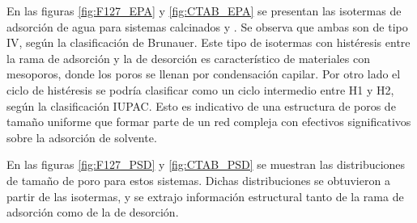 		 En las figuras \ref{fig:F127_EPA} y \ref{fig:CTAB_EPA} se presentan las isotermas de adsorción de agua para sistemas calcinados \pdmF\space y \pdmC. Se observa que ambas son de tipo IV, según la clasificación de Brunauer\cite{Gregg1967,Violi2015,Fuertes2010}. Este tipo de isotermas con histéresis entre la rama de adsorción y la de desorción es característico de materiales con mesoporos, donde los poros se llenan por condensación capilar. Por otro lado el ciclo de histéresis se podría clasificar como un ciclo intermedio entre H1 y H2, según la clasificación IUPAC\cite{Thommes2015}. Esto es indicativo de una estructura de poros de tamaño uniforme que formar parte de un red compleja con efectivos significativos sobre la adsorción de solvente.\cite{Thommes2015,Gregg1967,Lowell2004,Sing1985}

		 En las figuras \ref{fig:F127_PSD} y \ref{fig:CTAB_PSD} se muestran las distribuciones de tamaño de poro para estos sistemas. Dichas distribuciones se obtuvieron a partir de las isotermas, y se extrajo información estructural tanto de la rama de adsorción como de la de desorción.



